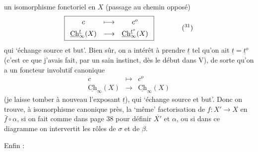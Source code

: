 \documentclass[11pt]{article}
\newcommand{\msp}[1]{\marginpar{\footnotesize [#1]}}
\newcommand{\uCh}{\underline{\mathrm{Ch}}}
\begin{document}
\msp{page 140}

un isomorphisme fonctoriel en $X$ (passage au chemin opposé)
\[
\boxed{\begin{array}{ccc}
c & \longmapsto & c^o\\[4pt]
\uCh^{\underline{t}}_\infty(X) & \longrightarrow & \uCh^{\underline{t}^o}_\infty(X)
\end{array}}
\qquad\qquad
\text{(\footnotemark[31])}
\]
qui `échange source et but'. Bien sûr, on a intérêt à prendre $\underline{t}$ tel qu'on ait $\underline{t}=\underline{t}^o$ (c'est ce que j'avais fait, par un sain instinct, dès le début dans V), de sorte qu'on a un foncteur involutif canonique
\[
\begin{array}{ccc}
c & \longmapsto & c^o\\[4pt]
\uCh_\infty(X) & \longrightarrow & \uCh_\infty(X)
\end{array}
\]
(je laisse tomber à nouveau l'exposant $\underline{t}$), qui `échange source et but'. Donc on trouve, à isomorphisme canonique près, la `même' factorisation de $f:X'\longrightarrow X$ en $\bar{f}\circ\alpha$, si on fait comme dans page 38 pour définir $\overline{X'}$ et $\alpha$, ou si dans ce diagramme on intervertit les rôles de $\sigma$ et de $\beta$. %

Enfin :
\end{document}

